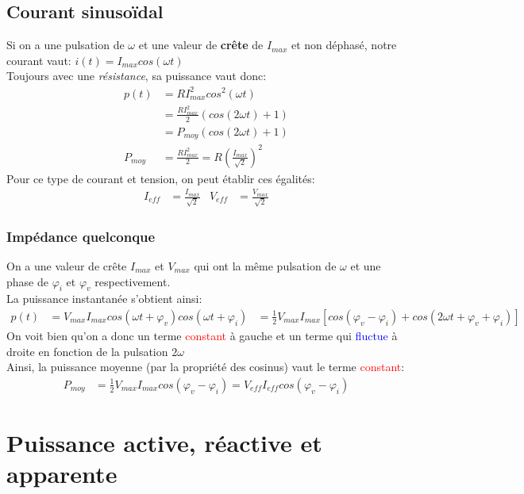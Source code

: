 \documentclass{report}
\begin{document}
\subsection{Courant sinusoïdal}
Si on a une pulsation de $\omega$ et une valeur de \textbf{crête} de $I_{max}$ et non déphasé, notre courant vaut: $i(t)= I_{max} cos(\omega t)$\\
Toujours avec une \textit{résistance}, sa puissance vaut donc:
\begin{align*}
p(t) &= R I_{max}^2 cos^2(\omega t)\\
&= \frac{R I_{max}^2}{2} (cos(2 \omega t) + 1)\\
&= P_{moy} (cos (2 \omega t ) +1 )\\
P_{moy} &= \frac{R I_{max}^2}{2} = R \left( \frac{I_{max}}{\sqrt{2}} \right)^2
\end{align*}
Pour ce type de courant et tension, on peut établir ces égalités:
\begin{align*}
I_{eff} &= \frac{I_{max}}{\sqrt{2}} & V_{eff} &= \frac{V_{max}}{\sqrt{2}}
\end{align*}

\subsubsection{Impédance quelconque}
On a une valeur de crête $I_{max}$ et $V_{max}$ qui ont la même pulsation de $\omega$ et une phase de $\varphi_i$ et $\varphi_v$ respectivement.\\
La puissance instantanée s'obtient ainsi:
\begin{align*}
p(t) &= V_{max}I_{max}cos(\omega t + \varphi_v) cos(\omega t + \varphi_i)
&= \frac{1}{2}V_{max}I_{max} [cos(\varphi_v -\varphi_i) + cos(2 \omega t + \varphi_v + \varphi_i)]
\end{align*}
On voit bien qu'on a donc un terme \textcolor{red}{constant} à gauche et un terme qui \textcolor{blue}{fluctue} à droite en fonction de la pulsation $2 \omega$\\
Ainsi, la puissance moyenne (par la propriété des cosinus) vaut le terme \textcolor{red}{constant}:
\begin{align*}
P_{moy} &= \frac{1}{2}V_{max}I_{max} cos(\varphi_v -\varphi_i) = V_{eff}I_{eff}cos(\varphi_v -\varphi_i)
\end{align*}

\section{Puissance active, réactive et apparente}
\end{document}
